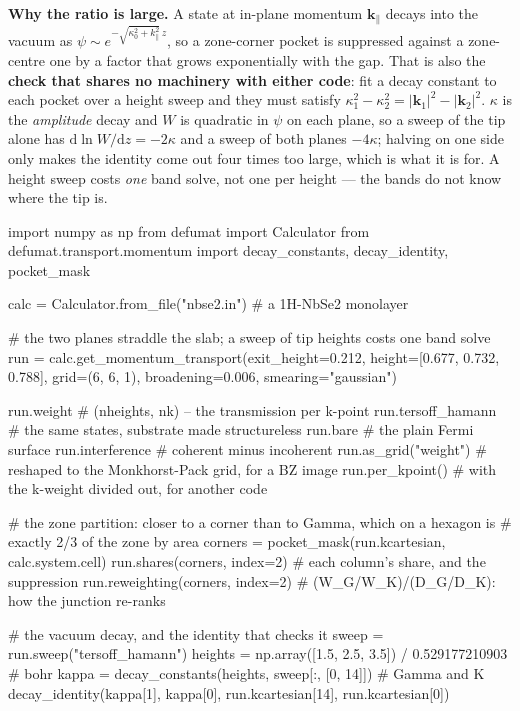 \documentclass[11pt,a4paper]{article}
\begin{document}
\textbf{Why the ratio is large.} A state at in-plane momentum
$\mathbf k_\parallel$ decays into the vacuum as
$\psi \sim e^{-\sqrt{\kappa_0^2 + k_\parallel^2}\, z}$, so a zone-corner pocket
is suppressed against a zone-centre one by a factor that grows exponentially
with the gap. That is also the \textbf{check that shares no machinery with
either code}: fit a decay constant to each pocket over a height sweep and they
must satisfy $\kappa_1^2 - \kappa_2^2 = |\mathbf k_1|^2 - |\mathbf k_2|^2$.
$\kappa$ is the \emph{amplitude} decay and $W$ is quadratic in $\psi$ on each
plane, so a sweep of the tip alone has $\mathrm{d}\ln W/\mathrm{d}z = -2\kappa$
and a sweep of both planes $-4\kappa$; halving on one side only makes the
identity come out four times too large, which is what it is for. A height sweep
costs \emph{one} band solve, not one per height --- the bands do not know where
the tip is.

\begin{pycode}
import numpy as np
from defumat import Calculator
from defumat.transport.momentum import decay_constants, decay_identity, pocket_mask

calc = Calculator.from_file("nbse2.in")          # a 1H-NbSe2 monolayer

# the two planes straddle the slab; a sweep of tip heights costs one band solve
run = calc.get_momentum_transport(exit_height=0.212, height=[0.677, 0.732, 0.788],
                                  grid=(6, 6, 1), broadening=0.006,
                                  smearing="gaussian")

run.weight            # (nheights, nk) -- the transmission per k-point
run.tersoff_hamann    # the same states, substrate made structureless
run.bare              # the plain Fermi surface
run.interference      # coherent minus incoherent
run.as_grid("weight") # reshaped to the Monkhorst-Pack grid, for a BZ image
run.per_kpoint()      # with the k-weight divided out, for another code

# the zone partition: closer to a corner than to Gamma, which on a hexagon is
# exactly 2/3 of the zone by area
corners = pocket_mask(run.kcartesian, calc.system.cell)
run.shares(corners, index=2)        # each column's share, and the suppression
run.reweighting(corners, index=2)   # (W_G/W_K)/(D_G/D_K): how the junction re-ranks

# the vacuum decay, and the identity that checks it
sweep = run.sweep("tersoff_hamann")
heights = np.array([1.5, 2.5, 3.5]) / 0.529177210903      # bohr
kappa = decay_constants(heights, sweep[:, [0, 14]])       # Gamma and K
decay_identity(kappa[1], kappa[0], run.kcartesian[14], run.kcartesian[0])
\end{pycode}
\end{document}
